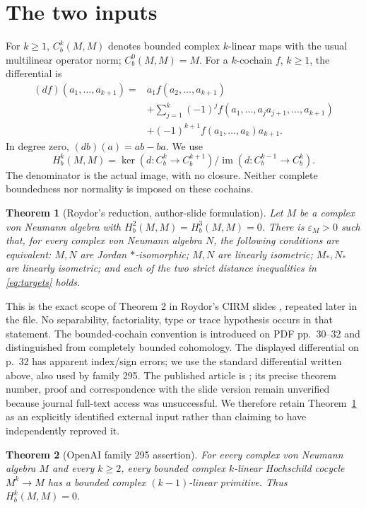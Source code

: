 \documentclass[11pt]{article}
\newtheorem{theorem}{Theorem}
\newcommand{\Cb}{C_b}
\newcommand{\Hb}{H_b}
\begin{document}
\section{The two inputs}

For $k\ge1$, $\Cb^k(M,M)$ denotes bounded complex $k$-linear maps
with the usual multilinear operator norm; $\Cb^0(M,M)=M$. For a
$k$-cochain $f$, $k\ge1$, the differential is
\begin{align*}
 (df)(a_1,\ldots,a_{k+1})={}&a_1f(a_2,\ldots,a_{k+1})\\
 &+\sum_{j=1}^k(-1)^j
 f(a_1,\ldots,a_ja_{j+1},\ldots,a_{k+1})\\
 &+(-1)^{k+1}f(a_1,\ldots,a_k)a_{k+1}.
\end{align*}
In degree zero, $(db)(a)=ab-ba$. We use
\[
 \Hb^k(M,M)=\ker(d:\Cb^k\to\Cb^{k+1})/
 \operatorname{im}(d:\Cb^{k-1}\to\Cb^k).
\]
The denominator is the actual image, with no closure. Neither
complete boundedness nor normality is imposed on these cochains.

\begin{theorem}[Roydor's reduction, author-slide formulation]\label{thm:roydor}
Let $M$ be a complex von Neumann algebra with
$\Hb^2(M,M)=\Hb^3(M,M)=0$. There is $\varepsilon_M>0$ such that,
for every complex von Neumann algebra $N$, the following conditions
are equivalent: $M,N$ are Jordan $*$-isomorphic; $M,N$ are linearly
isometric; $M_*,N_*$ are linearly isometric; and each of the two
strict distance inequalities in \eqref{eq:targets} holds.
\end{theorem}

This is the exact scope of Theorem 2 in Roydor's CIRM slides
\cite[PDF pp.~28--29]{RoydorSlides}, repeated later in the file. No
separability, factoriality, type or trace hypothesis occurs in that
statement. The bounded-cochain convention is introduced on PDF
pp.~30--32 and distinguished from completely bounded cohomology.
The displayed differential on p.~32 has apparent index/sign errors;
we use the standard differential written above, also used by family
295. The published article is \cite{Roydor2022}; its precise theorem
number, proof and correspondence with the slide version remain
unverified because journal full-text access was unsuccessful. We
therefore retain Theorem~\ref{thm:roydor} as an explicitly identified
external input rather than claiming to have independently reproved it.

\begin{theorem}[OpenAI family 295 assertion]\label{thm:input}
For every complex von Neumann algebra $M$ and every $k\ge2$, every
bounded complex $k$-linear Hochschild cocycle $M^k\to M$ has a
bounded complex $(k-1)$-linear primitive. Thus $\Hb^k(M,M)=0$.
\end{theorem}
\end{document}
